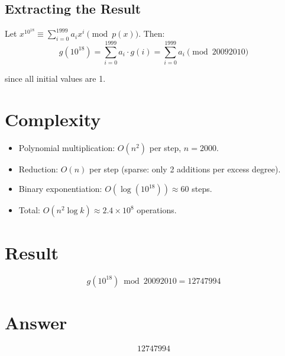 \documentclass[12pt]{article}
\begin{document}
\subsection{Extracting the Result}

Let $x^{10^{18}} \equiv \sum_{i=0}^{1999} a_i x^i \pmod{p(x)}$. Then:
\[
g(10^{18}) = \sum_{i=0}^{1999} a_i \cdot g(i) = \sum_{i=0}^{1999} a_i \pmod{20092010}
\]

since all initial values are 1.

\section{Complexity}

\begin{itemize}
    \item Polynomial multiplication: $O(n^2)$ per step, $n = 2000$.
    \item Reduction: $O(n)$ per step (sparse: only 2 additions per excess degree).
    \item Binary exponentiation: $O(\log(10^{18})) \approx 60$ steps.
    \item Total: $O(n^2 \log k) \approx 2.4 \times 10^8$ operations.
\end{itemize}

\section{Result}

\[
\boxed{g(10^{18}) \bmod 20092010 = 12747994}
\]

\section{Answer}

\[
\boxed{12747994}
\]
\end{document}
